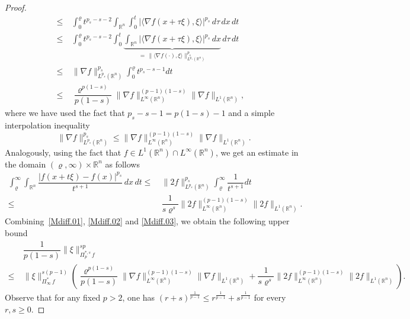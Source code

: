 \documentclass[11pt, reqno]{article}
\theoremstyle{definition}
\numberwithin{equation}{section}
\newcommand{\R}{\mathbb{R}}
\begin{document}
\begin{proof}
\begin{equation}
\begin{alignedat}{3}
        \leq & ~ 
        \int_0^{\varrho} t^{p_s - s - 2} \int_{\R^n} \int_0^t |\langle \nabla f(x + \tau \xi), \xi \rangle |^{p_s} \, d\tau \, dx \, dt & 
        \\
        \leq & ~ \int_0^{\varrho} t^{p_s - s - 2} \int_0^t \underbrace{\int_{\R^n} |\langle \nabla f(x + \tau \xi), \xi \rangle |^{p_s} \, dx}_{\, = \, \| \langle \nabla f (\cdot), \xi \rangle \|_{L^{p_s}(\R^n)}^{p_s}} \, d\tau \, dt &
        \\
        \leq & ~ \| \nabla f \|_{L^{p_s}(\R^n)}^{p_s} \int_0^\varrho t^{p_s - s - 1} dt & 
        \\
		\leq & ~ \dfrac{\varrho^{p(1 - s)}}{p(1 - s)} \| \nabla f \|^{(p - 1)(1 - s)}_{L^\infty(\R^n)} \| \nabla f \|_{L^1(\R^n)}, &
        \end{alignedat}
	\end{equation}
where we have used the fact that $p_s - s - 1 = p(1 - s) - 1$ and a simple interpolation inequality
\[
\| \nabla f \|_{L^{p_s}(\R^n)}^{p_s} \leq \| \nabla f \|^{(p - 1)(1 - s)}_{L^\infty(\R^n)} \| \nabla f \|_{L^1(\R^n)}.
\]
Analogously, using the fact that $f \in L^1(\R^n) \cap L^\infty(\R^n)$, we get an estimate in the domain $(\varrho, \infty) \times \R^n$ as follows
	\begin{equation}\label{Mdiff.03}
    \begin{split}
		\int_\varrho^\infty \int_{\R^n} \dfrac{|f(x + t \xi) - f(x)|^{p_s}}{t^{s + 1}} \,dx \,dt 
		\leq & ~  \| 2f \|^{p_s}_{L^{p_s}(\R^n)} \int_\varrho^\infty \dfrac{1}{t^{s + 1}} dt \\
		\leq & ~ \dfrac{1}{s\varrho^s} \| 2f \|^{(p - 1)(1 - s)}_{L^\infty(\R^n)} \| 2f \|_{L^1(\R^n)}.
    \end{split}
	\end{equation}
Combining~\eqref{Mdiff.01}, \eqref{Mdiff.02} and \eqref{Mdiff.03}, we obtain the following upper bound
	\begin{equation}\label{esti.iii-02}
    \begin{split}
		& ~ \dfrac{1}{p(1 - s)} \| \xi \|^{sp}_{\Pi^{\ast, s}_p \, f} 
        \\
		\leq & ~ \| 
		\xi \|_{\Pi^\ast_\infty \, f}^{s(p - 1)} 
		\left(
		\dfrac{\varrho^{p(1 - s)}}{p(1 - s)} \| \nabla f \|^{(p - 1)(1 - s)}_{L^\infty(\R^n)} \| \nabla f \|_{L^1(\R^n)} 
		+
		\dfrac{1}{s \varrho^s} \| 2f \|^{(p - 1)(1 - s)}_{L^\infty(\R^n)} \| 2f \|_{L^1(\R^n)} 
		\right).
    \end{split}
	\end{equation}
Observe that for any fixed $p > 2$, one has $(r + s)^{\frac{1}{p - 1}} \leq r^{\frac{1}{p - 1}} + s^{\frac{1}{p - 1}}$ for every $r, s \geq 0$.

\end{proof}
\end{document}
